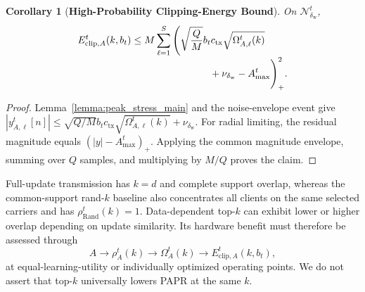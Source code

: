 \documentclass[journal]{IEEEtran}
\newenvironment{revisionblock}{\begingroup\color{revisionred}}{\endgroup}
\newtheorem{corollary}{Corollary}
\begin{document}
\begin{revisionblock}
\begin{corollary}[\bf High-Probability Clipping-Energy Bound]
\label{cor:clipping_link_main}
On $\mathcal{N}_{\delta_{\mathrm w}}^t$,
{
\begin{align}
	E_{\mathrm{clip},A}^t(k,b_t)
	&\le M\sum_{\ell=1}^{S}
	\Bigg(
	 \sqrt{\frac{Q}{M}}b_tc_{\mathrm{tx}}
	 \sqrt{\Omega_{A,\ell}^t(k)}
	\notag\\[-1mm]
	&\hspace{28mm}
	+\nu_{\delta_{\mathrm w}}-A_{\max}^t
	\Bigg)_+^2.
	\label{eqn:clipping_link_bound}
\end{align}
}
\end{corollary}
\begin{proof}
Lemma~\ref{lemma:peak_stress_main} and the noise-envelope event give $|y_{A,\ell}^t[n]|\le \sqrt{Q/M}b_tc_{\mathrm{tx}}\sqrt{\Omega_{A,\ell}^t(k)}+\nu_{\delta_{\mathrm w}}$. For radial limiting, the residual magnitude equals $(|y|-A_{\max}^t)_+$. Applying the common magnitude envelope, summing over $Q$ samples, and multiplying by $M/Q$ proves the claim.
\end{proof}

Full-update transmission has $k=d$ and complete support overlap, whereas the common-support rand-$k$ baseline also concentrates all clients on the same selected carriers and has $\rho_{\mathrm{Rand}}^t(k)=1$. Data-dependent top-$k$ can exhibit lower or higher overlap depending on update similarity. Its hardware benefit must therefore be assessed through
{
\begin{equation}
	A\rightarrow\rho_A^t(k)\rightarrow\Omega_A^t(k)
	\rightarrow E_{\mathrm{clip},A}^t(k,b_t),
\end{equation}
}
at equal-learning-utility or individually optimized operating points. We do not assert that top-$k$ universally lowers PAPR at the same $k$.

\end{revisionblock}
\end{document}
